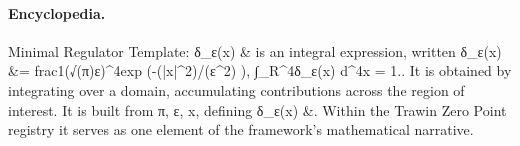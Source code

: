 \paragraph{Encyclopedia.}
Minimal Regulator Template: δ\_ε(x) \& is an integral expression, written δ\_ε(x) \&= frac1(√(π)ε)\textasciicircum{}4exp (-(|x|\textasciicircum{}2)/(ε\textasciicircum{}2) ), ∫\_R\textasciicircum{}4δ\_ε(x) d\textasciicircum{}4x = 1.. It is obtained by integrating over a domain, accumulating contributions across the region of interest. It is built from π, ε, x, defining δ\_ε(x) \&. Within the Trawin Zero Point registry it serves as one element of the framework's mathematical narrative.
